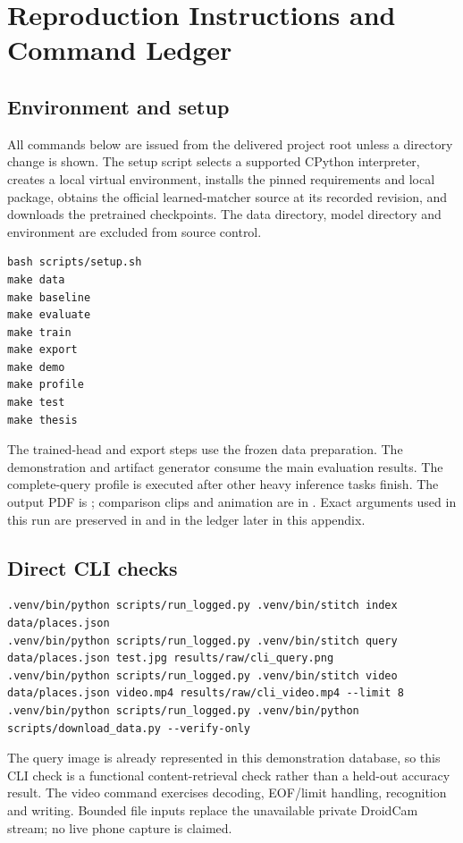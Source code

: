 \chapter{Reproduction Instructions\ifFullReport{} and Command Ledger\fi}\label{app:reproduction}
\section{Environment and setup}
All commands below are issued from the delivered project root unless a directory change is shown. The setup script selects a supported CPython interpreter, creates a local virtual environment, installs the pinned requirements and local package, obtains the official learned-matcher source at its recorded revision, and downloads the pretrained checkpoints. The data directory, model directory and environment are excluded from source control.
\begin{lstlisting}[numbers=none]
bash scripts/setup.sh
make data
make baseline
make evaluate
make train
make export
make demo
make profile
make test
make thesis
\end{lstlisting}
The trained-head and export steps use the frozen data preparation. The demonstration and artifact generator consume the main evaluation results. The complete-query profile is executed after other heavy inference tasks finish. The output PDF is ; comparison clips and animation are in . Exact arguments used in this run are preserved in \ifFullReport{} and in the ledger later in this appendix\fi.

\section{Direct CLI checks}
\begin{lstlisting}[numbers=none]
.venv/bin/python scripts/run_logged.py .venv/bin/stitch index data/places.json
.venv/bin/python scripts/run_logged.py .venv/bin/stitch query data/places.json test.jpg results/raw/cli_query.png
.venv/bin/python scripts/run_logged.py .venv/bin/stitch video data/places.json video.mp4 results/raw/cli_video.mp4 --limit 8
.venv/bin/python scripts/run_logged.py .venv/bin/python scripts/download_data.py --verify-only
\end{lstlisting}
The query image is already represented in this demonstration database, so this CLI check is a functional content-retrieval check rather than a held-out accuracy result. The video command exercises decoding, EOF/limit handling, recognition and writing. Bounded file inputs replace the unavailable private DroidCam stream; no live phone capture is claimed.

